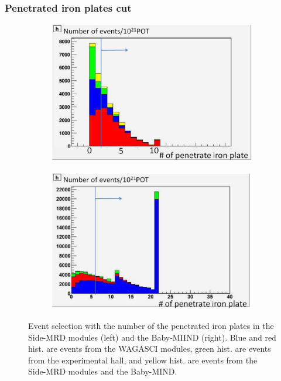 \subsubsection{Penetrated iron plates cut}


\begin{figure}[tbh]
  \begin{center}
   \begin{subfigure}{0.48\textwidth}
     \includegraphics[width=\linewidth]{fig/penetrated_iron_plates_cut_sidemrd.pdf}
    \end{subfigure}
  \begin{subfigure}{0.48\textwidth}
      \includegraphics[width=\linewidth]{fig/penetrated_iron_plates_cut_babymind.pdf}
    \end{subfigure}    
    \end{center}
  \caption{
Event selection with the number of the penetrated iron plates in the Side-MRD modules (left) and the Baby-MIIND (right).
Blue and red hist. are events from the WAGASCI modules, green hist. are events from the experimental hall, and yellow hist. are events from the Side-MRD modules and the Baby-MIND.
}
\label{fig:penetrated_iron_plates_cut}
\end{figure}






